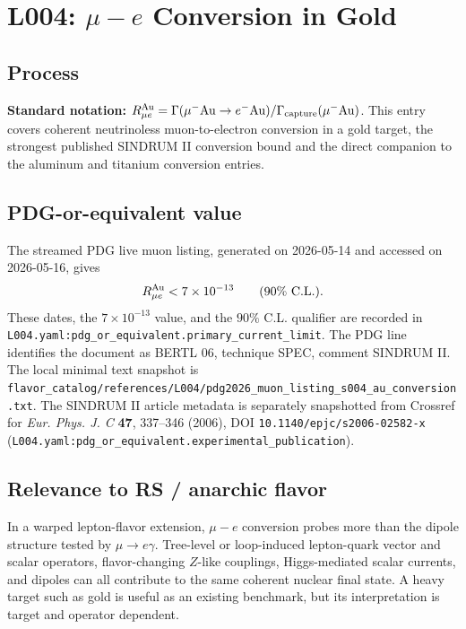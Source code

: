 
\section{L004: \texorpdfstring{\(\mu-e\)}{mu-e} Conversion in Gold}

\subsection*{Process}
\textbf{Standard notation:} \(R_{\mu e}^{\rm Au} =
\Gamma(\mu^-{\rm Au}\to e^-{\rm Au})/
\Gamma_{\rm capture}(\mu^-{\rm Au})\).
This entry covers coherent neutrinoless muon-to-electron conversion in a
gold target, the strongest published SINDRUM II conversion bound and the
direct companion to the aluminum and titanium conversion entries.

\subsection*{PDG-or-equivalent value}
The streamed PDG live muon listing, generated on 2026-05-14 and accessed on
2026-05-16, gives
\[
  R_{\mu e}^{\rm Au} < 7\times 10^{-13}\qquad (90\%\ {\rm C.L.}) .
\]
These dates, the \(7\times10^{-13}\) value, and the \(90\%\) C.L. qualifier are
recorded in
\texttt{L004.yaml:pdg\_or\_equivalent.primary\_current\_limit}.  The PDG line
identifies the document as BERTL 06, technique SPEC, comment SINDRUM II.  The
local minimal text snapshot is
\texttt{flavor\_catalog/references/L004/pdg2026\_muon\_listing\_s004\_au\_conversion.txt}.
The SINDRUM II article metadata is separately snapshotted from Crossref for
\textit{Eur. Phys. J. C} \textbf{47}, 337--346 (2006), DOI
\texttt{10.1140/epjc/s2006-02582-x}
(\texttt{L004.yaml:pdg\_or\_equivalent.experimental\_publication}).

\subsection*{Relevance to RS / anarchic flavor}
In a warped lepton-flavor extension, \(\mu-e\) conversion probes more than the
dipole structure tested by \(\mu\to e\gamma\).  Tree-level or loop-induced
lepton-quark vector and scalar operators, flavor-changing \(Z\)-like
couplings, Higgs-mediated scalar currents, and dipoles can all contribute to
the same coherent nuclear final state.  A heavy target such as gold is useful
as an existing benchmark, but its interpretation is target and operator
dependent.

